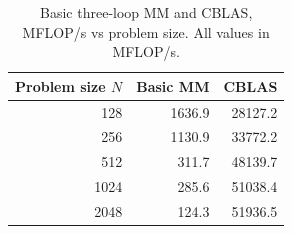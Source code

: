 \begin{table}[htbp]
\centering
\begin{tabular}{rrr}
\hline
Problem size $N$ & Basic MM & CBLAS \\
\hline
128 & 1636.9 & 28127.2 \\
256 & 1130.9 & 33772.2 \\
512 & 311.7 & 48139.7 \\
1024 & 285.6 & 51038.4 \\
2048 & 124.3 & 51936.5 \\
\hline
\end{tabular}
\caption{Basic three-loop MM and CBLAS, MFLOP/s vs problem size. All values in MFLOP/s.}
\label{tab:basic_vs_blas}
\end{table}
